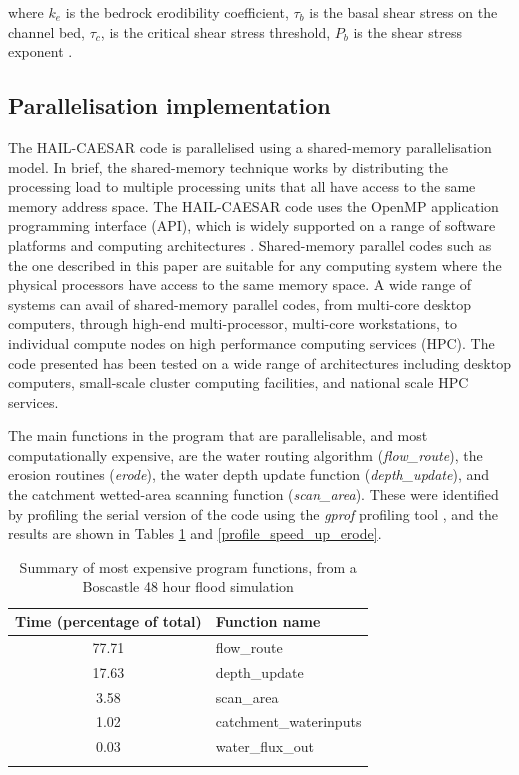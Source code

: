 where \(k_e\) is the bedrock erodibility coefficient, \(\tau_b\) is the basal shear stress on the channel bed, \(\tau_c\), is the critical shear stress threshold, \(P_b\) is the shear stress exponent \citep{howard1983channel,whipple1999dynamics}.

\subsection{Parallelisation implementation}
The HAIL-CAESAR code is parallelised using a shared-memory parallelisation model. In brief, the shared-memory technique works by distributing the processing load to multiple processing units that all have access to the same memory address space. The HAIL-CAESAR code uses the OpenMP application programming interface (API), which is widely supported on a range of software platforms and computing architectures \citep{dagum1998openmp}. Shared-memory parallel codes such as the one described in this paper are suitable for any computing system where the physical processors have access to the same memory space. A wide range of systems can avail of shared-memory parallel codes, from multi-core desktop computers, through high-end multi-processor, multi-core workstations, to individual compute nodes on high performance computing services (HPC). The code presented has been tested on a wide range of architectures including desktop computers,  small-scale cluster computing facilities, and national scale HPC services.

The main functions in the program that are parallelisable, and most computationally expensive, are the water routing algorithm (\textit{flow\_route}), the erosion routines (\textit{erode}), the water depth update function (\textit{depth\_update}), and the catchment wetted-area scanning function (\textit{scan\_area}). These were identified by profiling the serial version of the code using the \textit{gprof} profiling tool \citep{graham1982gprof}, and the results are shown in Tables \ref{profile_speed_up_hydro} and \ref{profile_speed_up_erode}.

\begin{table}
\caption{Summary of most expensive program functions, from a Boscastle 48 hour flood simulation}
\begin{tabular}{cl}

\textbf{Time} (percentage of total) & \textbf{Function name} \\
\hline
77.71                                     & flow\_route \\
17.63                                     & depth\_update \\
3.58                                       & scan\_area \\
1.02                                       & catchment\_waterinputs \\
0.03                                       & water\_flux\_out \\
\hline \\
\end{tabular} 
\label{profile_speed_up_hydro}
\end{table}

